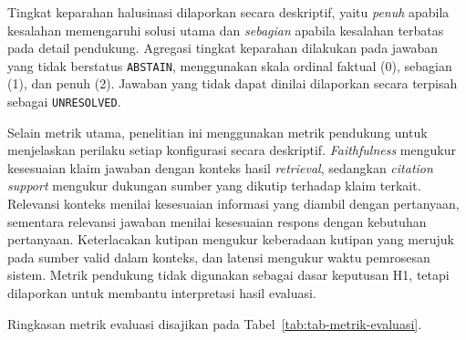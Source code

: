 Tingkat keparahan halusinasi dilaporkan secara deskriptif, yaitu \emph{penuh} apabila kesalahan memengaruhi solusi utama dan \emph{sebagian} apabila kesalahan terbatas pada detail pendukung. Agregasi tingkat keparahan dilakukan pada jawaban yang tidak berstatus \texttt{ABSTAIN}, menggunakan skala ordinal faktual (0), sebagian (1), dan penuh (2). Jawaban yang tidak dapat dinilai dilaporkan secara terpisah sebagai \texttt{UNRESOLVED}.

Selain metrik utama, penelitian ini menggunakan metrik pendukung untuk menjelaskan perilaku setiap konfigurasi secara deskriptif. \emph{Faithfulness} mengukur kesesuaian klaim jawaban dengan konteks hasil \emph{retrieval}, sedangkan \emph{citation support} mengukur dukungan sumber yang dikutip terhadap klaim terkait. Relevansi konteks menilai kesesuaian informasi yang diambil dengan pertanyaan, sementara relevansi jawaban menilai kesesuaian respons dengan kebutuhan pertanyaan. Keterlacakan kutipan mengukur keberadaan kutipan yang merujuk pada sumber valid dalam konteks, dan latensi mengukur waktu pemrosesan sistem. Metrik pendukung tidak digunakan sebagai dasar keputusan H1, tetapi dilaporkan untuk membantu interpretasi hasil evaluasi.

Ringkasan metrik evaluasi disajikan pada Tabel~\ref{tab:tab-metrik-evaluasi}.

